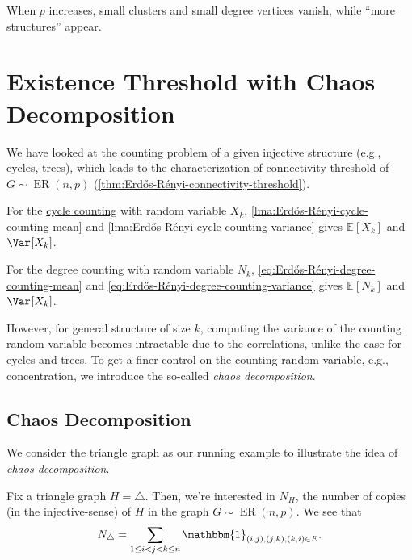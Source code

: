 \begin{note}
	When \(p\) increases, small clusters and small degree vertices vanish, while ``more structures'' appear.
\end{note}

\section{Existence Threshold with Chaos Decomposition}
We have looked at the counting problem of a given injective structure (e.g., cycles, trees), which leads to the characterization of connectivity threshold of \(G \sim \operatorname{ER}(n, p) \) (\autoref{thm:Erdős-Rényi-connectivity-threshold}).

\begin{prev}[Cycle]
	For the \hyperref[prb:cycle-counting]{cycle counting} with random variable \(X_k\), \autoref{lma:Erdős-Rényi-cycle-counting-mean} and \autoref{lma:Erdős-Rényi-cycle-counting-variance} gives \(\mathbb{E}_{}[X_k] \) and \(\Var_{}[X_k] \).
\end{prev}

\begin{prev}[Degree]
	For the degree counting with random variable \(N_k\), \autoref{eq:Erdős-Rényi-degree-counting-mean} and \autoref{eq:Erdős-Rényi-degree-counting-variance} gives \(\mathbb{E}_{}[N_k] \) and \(\Var_{}[X_k] \).
\end{prev}

However, for general structure of size \(k\), computing the variance of the counting random variable becomes intractable due to the correlations, unlike the case for cycles and trees. To get a finer control on the counting random variable, e.g., concentration, we introduce the so-called \emph{chaos decomposition}.

\subsection{Chaos Decomposition}
We consider the triangle graph as our running example to illustrate the idea of \emph{chaos decomposition}.

\begin{eg}
	Fix a triangle graph \(H = \triangle\). Then, we're interested in \(N_H\), the number of copies (in the injective-sense) of \(H\) in the graph \(G \sim \operatorname{ER}(n, p) \). We see that
	\[
		N_{\triangle}
		= \sum_{1 \leq i < j < k \leq n} \mathbbm{1}_{(i, j), (j, k), (k, i) \in E}.
	\]
\end{eg}

